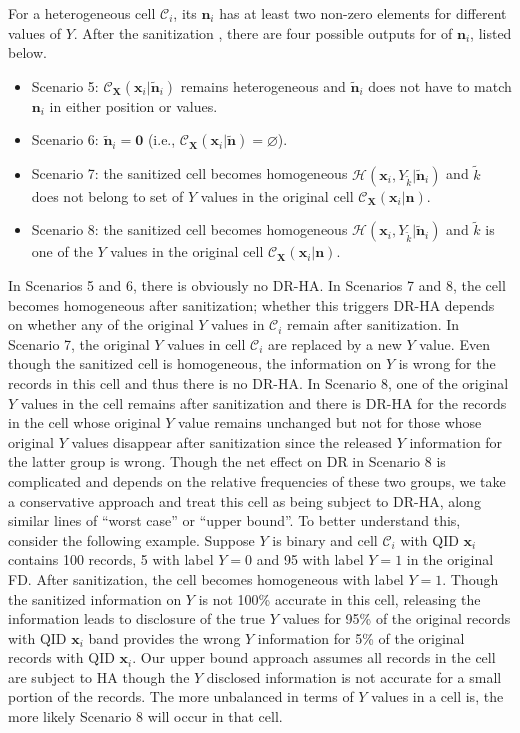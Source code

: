\documentclass[10pt,journal,compsoc]{IEEEtran}
\newcommand{\n}{\mathbf{n}}
\newcommand{\X}{\mathbf{X}}
\newcommand{\x}{\mathbf{x}}
\newcommand{\C}{\mathcal{C}}
\begin{document}
For a heterogeneous cell $\C_i$, its $\n_i$ has at least two  non-zero elements for different values of $Y$. After the sanitization , there are four possible outputs for of $\n_i$, listed below. \vspace{-3pt}
\begin{itemize}[leftmargin=12pt]\setlength\itemsep{-3pt} 
\item Scenario 5: $\C_{\X}(\x_i|\tilde{\n}_i)$ remains heterogeneous and $\tilde{\n}_i$ does not have to match $\n_i$ in either position or values.
\item Scenario 6: $\tilde{\n}_i=\mathbf{0}$  (i.e., $\C_{\X}(\x_i|\tilde{\n})=\varnothing$).
\item Scenario 7: the sanitized cell becomes homogeneous $\mathcal{H}(\x_i,Y_{\tilde{k}}|\tilde{\n}_i)$ and $\tilde{k}$ does not belong to set of $Y$ values in the original cell $\C_{\X}(\x_i|\n)$.
\item Scenario 8: the sanitized cell becomes homogeneous $\mathcal{H}(\x_i,Y_{\tilde{k}}|\tilde{\n}_i)$ and $\tilde{k}$ is one of the $Y$ values in the original cell $\C_{\X}(\x_i|\n)$.
\end{itemize}\vspace{-1pt}
In Scenarios 5 and 6,  there is obviously no DR-HA. In Scenarios 7 and 8, the cell becomes homogeneous after sanitization; whether this triggers DR-HA depends on whether any of the original $Y$ values in $\C_i$ remain after sanitization. In Scenario 7, the original $Y$ values in cell $\C_i$ are replaced by a new $Y$ value. Even though the sanitized cell is homogeneous, the information on $Y$ is wrong for the records in this cell and thus there is no DR-HA. In Scenario 8,  one of the original $Y$ values in the cell remains after sanitization and there is DR-HA  for the records in the cell whose original $Y$ value remains unchanged but not for those whose original $Y$ values disappear after sanitization since the released $Y$ information for the latter group is wrong. Though the net effect on DR in Scenario 8 is complicated and depends on the relative frequencies of these two groups, we take a conservative approach and treat this cell as being subject to DR-HA, along similar lines of ``worst case'' or ``upper bound''. To  better understand this, consider the following example. Suppose $Y$ is binary and cell $\C_i$ with QID $\x_i$ contains 100 records, 5 with label $Y\!=\!0$ and 95 with label $Y\!=\!1$ in the original FD. After sanitization, the cell becomes homogeneous with label $Y\!=\!1$. Though the sanitized information on $Y$ is not 100\% accurate in this cell, releasing the information leads to disclosure of the true $Y$ values for 95\% of the original records with QID $\x_i$ band provides the wrong $Y$ information for 5\% of the original records with QID $\x_i$. Our upper bound approach assumes all records in the cell are subject to HA though the $Y$  disclosed information is not accurate for a small portion of the records. The more unbalanced in terms of $Y$ values in a cell is, the more likely Scenario 8 will occur in that cell.
\end{document}
